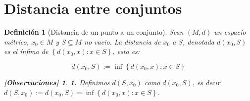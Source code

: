 \documentclass[oneside]{book} %
\theoremstyle{Teorema}
\newtheorem{Definicion}{Definición}[chapter]
\theoremstyle{Ejemplos}
\theoremstyle{[Obs]}
\newtheorem*{Obs}{[Observaciones]}
\renewcommand{\{}{\left\lbrace} %
\renewcommand{\}}{\right\rbrace} %
\renewcommand{\sc}{\subseteq} %
\begin{document}
		\section{Distancia entre conjuntos}

			\begin{Definicion}[Distancia de un punto a un conjunto]\setlength{\parindent}{0em}
				
				Sean $(M, d)$ un espacio métrico, $x_0 \in M$ y $S \sc M$ no vacio. La distancia de $x_0$ a $S$, denotada $d(x_0, S)$ es el ínfimo de $\{ d(x_0, x) : x \in S \}$, esto es: 

				\[ d(x_0, S) := \inf\{ d(x_0, x) : x \in S \} \] 

				\begin{Obs}
				
					\textbf{1.} Definimos $d(S, x_0)$ como $d(x_0, S)$, es decir $d(S, x_0) := d(x_0, S) = \inf\{ d(x_0, x) : x \in S \}$. 
				
				\end{Obs}

			\end{Definicion}
\end{document}
